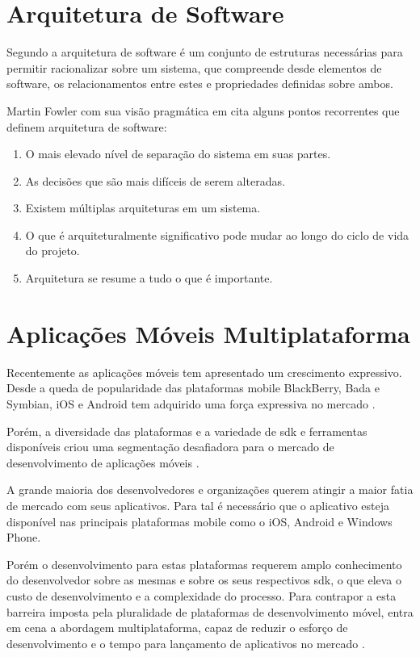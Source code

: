 \documentclass[
	article,			%
	11pt,				%
	oneside,			%
	a4paper,			%
	english,			%
	brazil,				%
	sumario=tradicional
]{abntex2}
\begin{document}
\section{Arquitetura de Software}

Segundo \cite{bass2012practice} a arquitetura de software é um conjunto de estruturas necessárias para permitir racionalizar sobre um sistema, que compreende desde elementos de software, os relacionamentos entre estes e propriedades definidas sobre ambos.

Martin Fowler com sua visão pragmática em \cite{fowler2002patterns} cita alguns pontos recorrentes que definem arquitetura de software:
\begin{enumerate}
	\item O mais elevado nível de separação do sistema em suas partes.
	\item As decisões que são mais difíceis de serem alteradas.
	\item Existem múltiplas arquiteturas em um sistema.
	\item O que é arquiteturalmente significativo pode mudar ao longo do ciclo de vida do projeto.
	\item Arquitetura se resume a tudo o que é importante.
\end{enumerate}

\section{Aplicações Móveis Multiplataforma}
Recentemente as aplicações móveis tem apresentado um crescimento expressivo. Desde a queda de popularidade das plataformas mobile BlackBerry, Bada e Symbian, iOS e Android tem adquirido uma força expressiva no mercado \cite{dalmasso2013survey}.

Porém, a diversidade das plataformas e a variedade de \gls{sdk} e ferramentas disponíveis criou uma segmentação desafiadora para o mercado de desenvolvimento de aplicações móveis \cite{dalmasso2013survey}.

A grande maioria dos desenvolvedores e organizações querem atingir a maior fatia de mercado com seus aplicativos. Para tal é necessário que o aplicativo esteja disponível nas principais plataformas mobile como o iOS, Android e Windows Phone. 

Porém o desenvolvimento para estas plataformas requerem amplo conhecimento do desenvolvedor sobre as mesmas e sobre os seus respectivos \gls{sdk}, o que eleva o custo de desenvolvimento e a complexidade do processo. Para contrapor a esta barreira imposta pela pluralidade de plataformas de desenvolvimento móvel, entra em cena a abordagem multiplataforma, capaz de reduzir o esforço de desenvolvimento e o tempo para lançamento de aplicativos no mercado \cite{dalmasso2013survey}.
\end{document}
